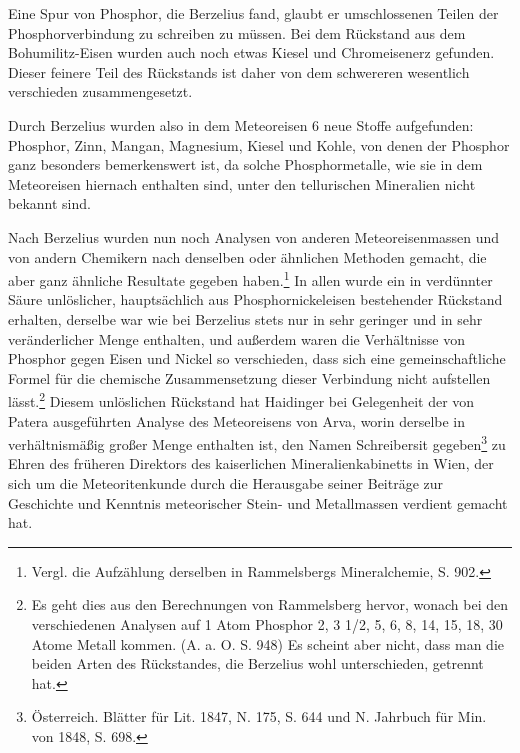 \documentclass[a4paper, 11pt, oneside]{article}
\begin{document}
Eine Spur von Phosphor, die Berzelius fand, glaubt er umschlossenen Teilen der Phosphorverbindung zu schreiben zu müssen. Bei dem Rückstand aus dem Bohumilitz-Eisen wurden auch noch etwas Kiesel und Chromeisenerz gefunden. Dieser feinere Teil des Rückstands ist daher von dem schwereren wesentlich verschieden zusammengesetzt.

Durch Berzelius wurden also in dem Meteoreisen 6 neue Stoffe aufgefunden: Phosphor, Zinn, Mangan, Magnesium, Kiesel und Kohle, von denen der Phosphor ganz besonders bemerkenswert ist, da solche Phosphormetalle, wie sie in dem Meteoreisen hiernach enthalten sind, unter den tellurischen Mineralien nicht bekannt sind.

Nach Berzelius wurden nun noch Analysen von anderen Meteoreisenmassen und von andern Chemikern nach denselben oder ähnlichen Methoden gemacht, die aber ganz ähnliche Resultate gegeben haben.\footnote{Vergl. die Aufzählung derselben in Rammelsbergs Mineralchemie, S. 902.} In allen wurde ein in verdünnter Säure unlöslicher, hauptsächlich aus Phosphornickeleisen bestehender Rückstand erhalten, derselbe war wie bei Berzelius stets nur in sehr geringer und in sehr veränderlicher Menge enthalten, und außerdem waren die Verhältnisse von Phosphor gegen Eisen und Nickel so verschieden, dass sich eine gemeinschaftliche Formel für die chemische Zusammensetzung dieser Verbindung nicht aufstellen lässt.\footnote{Es geht dies aus den Berechnungen von Rammelsberg hervor, wonach bei den verschiedenen Analysen auf 1 Atom Phosphor 2, 3 1/2, 5, 6, 8, 14, 15, 18, 30 Atome Metall kommen. (A. a. O. S. 948) Es scheint aber nicht, dass man die beiden Arten des Rückstandes, die Berzelius wohl unterschieden, getrennt hat.} Diesem unlöslichen Rückstand hat Haidinger bei Gelegenheit der von Patera ausgeführten Analyse des Meteoreisens von Arva, worin derselbe in verhältnismäßig großer Menge enthalten ist, den Namen Schreibersit gegeben\footnote{Österreich. Blätter für Lit. 1847, N. 175, S. 644 und N. Jahrbuch für Min. von 1848, S. 698.} zu Ehren des früheren Direktors des kaiserlichen Mineralienkabinetts in Wien, der sich um die Meteoritenkunde durch die Herausgabe seiner Beiträge zur Geschichte und Kenntnis meteorischer Stein- und Metallmassen verdient gemacht hat.
\end{document}
